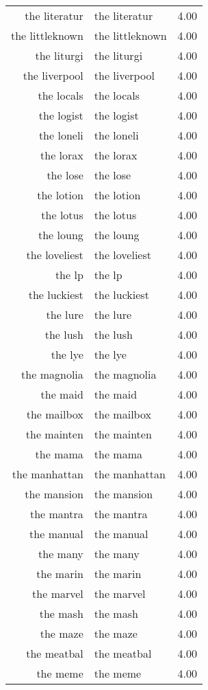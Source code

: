 \begin{table}[ht]
\begin{tabular}{rlr}
  the literatur & the literatur & 4.00 \\ 
  the littleknown & the littleknown & 4.00 \\ 
  the liturgi & the liturgi & 4.00 \\ 
  the liverpool & the liverpool & 4.00 \\ 
  the locals & the locals & 4.00 \\ 
  the logist & the logist & 4.00 \\ 
  the loneli & the loneli & 4.00 \\ 
  the lorax & the lorax & 4.00 \\ 
  the lose & the lose & 4.00 \\ 
  the lotion & the lotion & 4.00 \\ 
  the lotus & the lotus & 4.00 \\ 
  the loung & the loung & 4.00 \\ 
  the loveliest & the loveliest & 4.00 \\ 
  the lp & the lp & 4.00 \\ 
  the luckiest & the luckiest & 4.00 \\ 
  the lure & the lure & 4.00 \\ 
  the lush & the lush & 4.00 \\ 
  the lye & the lye & 4.00 \\ 
  the magnolia & the magnolia & 4.00 \\ 
  the maid & the maid & 4.00 \\ 
  the mailbox & the mailbox & 4.00 \\ 
  the mainten & the mainten & 4.00 \\ 
  the mama & the mama & 4.00 \\ 
  the manhattan & the manhattan & 4.00 \\ 
  the mansion & the mansion & 4.00 \\ 
  the mantra & the mantra & 4.00 \\ 
  the manual & the manual & 4.00 \\ 
  the many & the many & 4.00 \\ 
  the marin & the marin & 4.00 \\ 
  the marvel & the marvel & 4.00 \\ 
  the mash & the mash & 4.00 \\ 
  the maze & the maze & 4.00 \\ 
  the meatbal & the meatbal & 4.00 \\ 
  the meme & the meme & 4.00 \\ 

\end{tabular}
\end{table}
